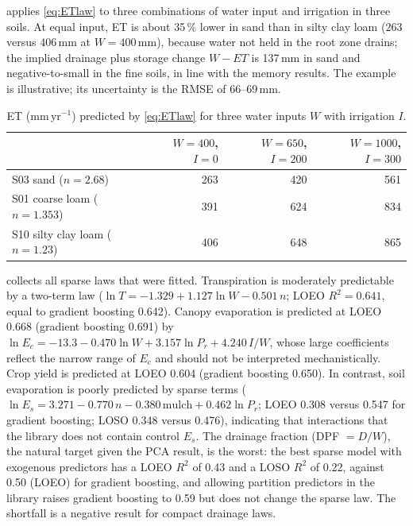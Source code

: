  applies \cref{eq:ETlaw} to three combinations of water input and irrigation in three soils. At equal input, ET is about 35\,\% lower in sand than in silty clay loam ($263$ versus $406$\,mm at $W=400$\,mm), because water not held in the root zone drains; the implied drainage plus storage change $W-\mathit{ET}$ is 137\,mm in sand and negative-to-small in the fine soils, in line with the memory results. The example is illustrative; its uncertainty is the RMSE of 66--69\,mm.

\begin{table}[H]\centering\small
\caption{ET (mm\,yr$^{-1}$) predicted by \cref{eq:ETlaw} for three water inputs $W$ with irrigation $I$.}
\label{tab:example}
\begin{tabular}{lrrr}
\toprule
 & $W=400$, $I=0$ & $W=650$, $I=200$ & $W=1000$, $I=300$\\\midrule
S03 sand ($n=2.68$) & 263 & 420 & 561\\
S01 coarse loam ($n=1.353$) & 391 & 624 & 834\\
S10 silty clay loam ($n=1.23$) & 406 & 648 & 865\\\bottomrule
\end{tabular}
\end{table}

\label{sec:failures}
 collects all sparse laws that were fitted. Transpiration is moderately predictable by a two-term law ($\ln T=-1.329+1.127\ln W-0.501\,n$; LOEO $R^2=0.641$, equal to gradient boosting 0.642). Canopy evaporation is predicted at LOEO 0.668 (gradient boosting 0.691) by $\ln E_c=-13.3-0.470\ln W+3.157\ln P_r+4.240\,I/W$, whose large coefficients reflect the narrow range of $E_c$ and should not be interpreted mechanistically. Crop yield is predicted at LOEO 0.604 (gradient boosting 0.650). In contrast, soil evaporation is poorly predicted by sparse terms ($\ln E_s=3.271-0.770\,n-0.380\,\mathrm{mulch}+0.462\ln P_r$; LOEO 0.308 versus 0.547 for gradient boosting; LOSO 0.348 versus 0.476), indicating that interactions that the library does not contain control $E_s$. The drainage fraction (DPF $=D/W$), the natural target given the PCA result, is the worst: the best sparse model with exogenous predictors has a LOEO $R^2$ of 0.43 and a LOSO $R^2$ of 0.22, against 0.50 (LOEO) for gradient boosting, and allowing partition predictors in the library raises gradient boosting to 0.59 but does not change the sparse law. The shortfall is a negative result for compact drainage laws.

